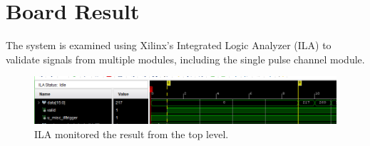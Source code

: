 


\section{Board Result}
The system is examined using Xilinx's Integrated Logic Analyzer (ILA) to validate signals from multiple modules, including the single pulse channel module.  
\begin{figure}[ht]
    \centering
    \includegraphics[width=1\linewidth]{figures/ila.png}
    \caption{ILA monitored the result from the top level.}
    \label{fig:ila}
\end{figure}

